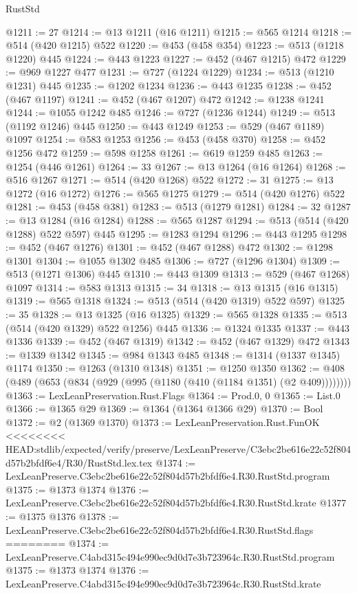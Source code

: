 \begin{lexlean}{RustStd}
\begin{coremodule}
{\begin{coremodule}
{{{{{{{{{{{@1211 := 27
@1214 := @13 @1211 (@16 @1211)
@1215 := @565 @1214
@1218 := @514 (@420 @1215) @522
@1220 := @453 (@458 @354)
@1223 := @513 (@1218 @1220) @445
@1224 := @443 @1223
@1227 := @452 (@467 @1215) @472
@1229 := @969 @1227 @477
@1231 := @727 (@1224 @1229)
@1234 := @513 (@1210 @1231) @445
@1235 := @1202 @1234
@1236 := @443 @1235
@1238 := @452 (@467 @1197)
@1241 := @452 (@467 @1207) @472
@1242 := @1238 @1241
@1244 := @1055 @1242 @485
@1246 := @727 (@1236 @1244)
@1249 := @513 (@1192 @1246) @445
@1250 := @443 @1249
@1253 := @529 (@467 @1189) @1097
@1254 := @583 @1253
@1256 := @453 (@458 @370)
@1258 := @452 @1256 @472
@1259 := @598 @1258
@1261 := @619 @1259 @485
@1263 := @1254 (@446 @1261)
@1264 := 33
@1267 := @13 @1264 (@16 @1264)
@1268 := @516 @1267
@1271 := @514 (@420 @1268) @522
@1272 := 31
@1275 := @13 @1272 (@16 @1272)
@1276 := @565 @1275
@1279 := @514 (@420 @1276) @522
@1281 := @453 (@458 @381)
@1283 := @513 (@1279 @1281)
@1284 := 32
@1287 := @13 @1284 (@16 @1284)
@1288 := @565 @1287
@1294 := @513 (@514 (@420 @1288) @522 @597) @445
@1295 := @1283 @1294
@1296 := @443 @1295
@1298 := @452 (@467 @1276)
@1301 := @452 (@467 @1288) @472
@1302 := @1298 @1301
@1304 := @1055 @1302 @485
@1306 := @727 (@1296 @1304)
@1309 := @513 (@1271 @1306) @445
@1310 := @443 @1309
@1313 := @529 (@467 @1268) @1097
@1314 := @583 @1313
@1315 := 34
@1318 := @13 @1315 (@16 @1315)
@1319 := @565 @1318
@1324 := @513 (@514 (@420 @1319) @522 @597)
@1325 := 35
@1328 := @13 @1325 (@16 @1325)
@1329 := @565 @1328
@1335 := @513 (@514 (@420 @1329) @522 @1256) @445
@1336 := @1324 @1335
@1337 := @443 @1336
@1339 := @452 (@467 @1319)
@1342 := @452 (@467 @1329) @472
@1343 := @1339 @1342
@1345 := @984 @1343 @485
@1348 := @1314 (@1337 @1345) @1174
@1350 := @1263 (@1310 @1348)
@1351 := @1250 @1350
@1362 := @408 (@489 (@653 (@834 (@929 (@995 (@1180 (@410 (@1184 @1351) (@2 @409))))))))
@1363 := LexLeanPreservation.Rust.Flags
@1364 := Prod.{0, 0}
@1365 := List.{0}
@1366 := @1365 @29
@1369 := @1364 (@1364 @1366 @29)
@1370 := Bool
@1372 := @2 (@1369 @1370)
@1373 := LexLeanPreservation.Rust.FunOK
<<<<<<<< HEAD:stdlib/expected/verify/preserve/LexLeanPreserve/C3ebc2be616e22c52f804d57b2bfdf6e4/R30/RustStd.lex.tex
@1374 := LexLeanPreserve.C3ebc2be616e22c52f804d57b2bfdf6e4.R30.RustStd.program
@1375 := @1373 @1374
@1376 := LexLeanPreserve.C3ebc2be616e22c52f804d57b2bfdf6e4.R30.RustStd.krate
@1377 := @1375 @1376
@1378 := LexLeanPreserve.C3ebc2be616e22c52f804d57b2bfdf6e4.R30.RustStd.flags
========
@1374 := LexLeanPreserve.C4abd315c494e990ec9d0d7e3b723964c.R30.RustStd.program
@1375 := @1373 @1374
@1376 := LexLeanPreserve.C4abd315c494e990ec9d0d7e3b723964c.R30.RustStd.krate
}}}}}}}}}}}
\end{coremodule}}
\end{coremodule}
\end{lexlean}
